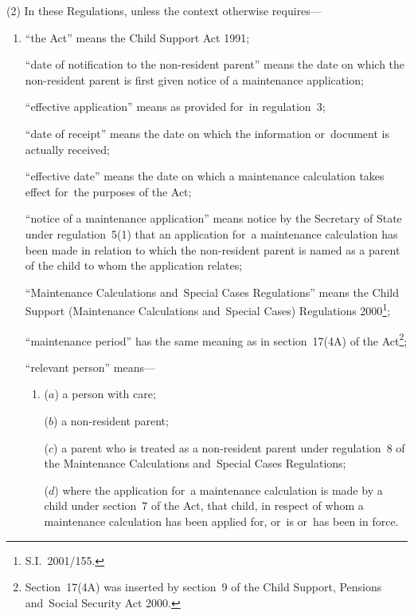 \documentclass[12pt,a4paper]{article}
\begin{document}
(2) In these Regulations, unless the context otherwise requires—
\begin{enumerate}\item[]
“the Act” means the Child Support Act 1991;

“date of notification to the non-resident parent” means the date on which the non-resident parent is first given notice of a maintenance application;

“effective application” means as provided for~in regulation~3;

“date of receipt” means the date on which the information or~document is actually received;

“effective date” means the date on which a maintenance calculation takes effect for~the purposes of the Act;

“notice of a maintenance application” means notice by the Secretary of State under regulation~5(1) that an application for~a maintenance calculation has been made
in relation to which the non-resident parent is named as a parent of the child to whom the application relates;

“Maintenance Calculations and~Special Cases Regulations” means the Child Support (Maintenance Calculations and~Special Cases) Regulations 2000\footnote{S.I.~2001/155.};

“maintenance period” has the same meaning as in section~17(4A) of the Act\footnote{Section~17(4A) was inserted by section~9 of the Child Support, Pensions and~Social Security Act 2000.};

“relevant person” means—
\begin{enumerate}\item[]
($a$) 
a person with care;

($b$) 
a non-resident parent;

($c$) 
a parent who is treated as a non-resident parent under regulation~8 of the Maintenance Calculations and~Special Cases Regulations;

($d$) 
where the application for~a maintenance calculation is made by a child under section~7 of the Act, that child, in respect of whom a maintenance calculation has been applied for, 
or~is or~has been in force.
\end{enumerate}
\end{enumerate}
\end{document}
